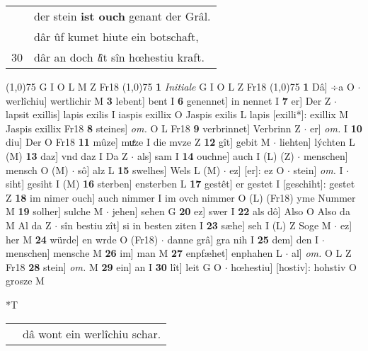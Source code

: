 \documentclass[8pt,a4paper,notitlepage]{article}
\begin{document}
\begin{table}[ht]
\begin{minipage}[t]{0.5\linewidth}
\begin{tabular}{rl}
 & der stein \textbf{ist ouch} genant der Grâl.\\ 
 & dâr ûf kumet hiute ein botschaft,\\ 
30 & dâr an doch \textit{l}ît sîn hœhestiu kraft.\\ 
\end{tabular}
\scriptsize
\line(1,0){75} \newline
G I O L M Z Fr18 \newline
\line(1,0){75} \newline
\textbf{1} \textit{Initiale} G I O L Z Fr18  \newline
\line(1,0){75} \newline
\textbf{1} Dâ] ÷a O  $\cdot$ werlîchiu] wertlichir M \textbf{3} lebent] bent I \textbf{6} genennet] in nennet I \textbf{7} er] Der Z  $\cdot$ lapsit exillis] lapis exilis I iaspis exillix O Jaspis exilis L lapis [exilli*]: exillix M Jaspis exillix Fr18 \textbf{8} steines] \textit{om.} O L Fr18 \textbf{9} verbrinnet] Verbrinn Z  $\cdot$ er] \textit{om.} I \textbf{10} diu] Der O Fr18 \textbf{11} mûze] muͤze I die mvze Z \textbf{12} gît] gebit M  $\cdot$ liehten] lýchten L (M) \textbf{13} daz] vnd daz I Da Z  $\cdot$ als] sam I \textbf{14} ouchne] auch I (L) (Z)  $\cdot$ menschen] mensch O (M)  $\cdot$ sô] alz L \textbf{15} swelhes] Wels L (M)  $\cdot$ ez] [er]: ez O  $\cdot$ stein] \textit{om.} I  $\cdot$ siht] gesiht I (M) \textbf{16} sterben] ensterben L \textbf{17} gestêt] er gestet I [geschiht]: gestet Z \textbf{18} im nimer ouch] auch nimmer I im ovch nimmer O (L) (Fr18) yme Nummer M \textbf{19} solher] sulche M  $\cdot$ jehen] sehen G \textbf{20} ez] swer I \textbf{22} als dô] Also O Also da M Al da Z  $\cdot$ sîn bestiu zît] si in besten ziten I \textbf{23} sæhe] seh I (L) Z Soge M  $\cdot$ ez] her M \textbf{24} würde] en wrde O (Fr18)  $\cdot$ danne grâ] gra nih I \textbf{25} dem] den I  $\cdot$ menschen] mensche M \textbf{26} im] man M \textbf{27} enpfæhet] enphahen L  $\cdot$ al] \textit{om.} O L Z Fr18 \textbf{28} stein] \textit{om.} M \textbf{29} ein] an I \textbf{30} lît] leit G O  $\cdot$ hœhestiu] [hostiv]: hohstiv O grosze M \newline
\end{minipage}
\hspace{0.5cm}
\begin{minipage}[t]{0.5\linewidth}
\small
\begin{center}*T
\end{center}
\begin{tabular}{rl}
 & dâ wont ein werlîchiu schar.\\ 

\end{tabular}
\end{minipage}
\end{table}
\end{document}
